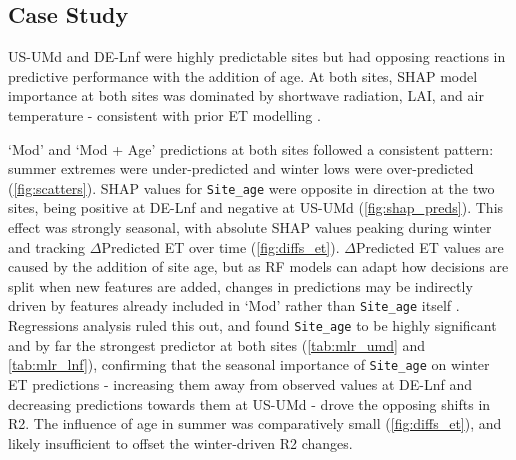 \subsection{Case Study}
\par %
US-UMd and DE-Lnf were highly predictable sites but had opposing reactions in predictive performance with the addition of age. At both sites, SHAP model importance at both sites was dominated by shortwave radiation, \ac{LAI}, and air temperature - consistent with prior ET modelling \parencite{liyew2025review}. 
\par `Mod' and `Mod + Age' predictions at both sites followed a consistent pattern: summer extremes were under-predicted and winter lows were over-predicted (\autoref{fig:scatters}). SHAP values for \texttt{Site\_age} were opposite in direction at the two sites, being positive at DE-Lnf and negative at US-UMd (\autoref{fig:shap_preds}). This effect was strongly seasonal, with absolute SHAP values peaking during winter and tracking $\Delta$Predicted ET over time  (\autoref{fig:diffs_et}). $\Delta$Predicted ET values are caused by the addition of site age, but as RF models can adapt how decisions are split when new features are added, changes in predictions may be indirectly driven by features already included in `Mod' rather than \texttt{Site\_age} itself \parencite{biau2016random}. Regressions analysis ruled this out, and found \texttt{Site\_age} to be highly significant and by far the strongest predictor at both sites (\autoref{tab:mlr_umd} and \autoref{tab:mlr_lnf}), confirming that the seasonal importance of \texttt{Site\_age} on winter ET predictions - increasing them away from observed values at DE-Lnf and decreasing predictions towards them at US-UMd - drove the opposing shifts in \ac{R2}. The influence of age in summer was comparatively small (\autoref{fig:diffs_et}), and likely insufficient to offset the winter-driven \ac{R2} changes.

